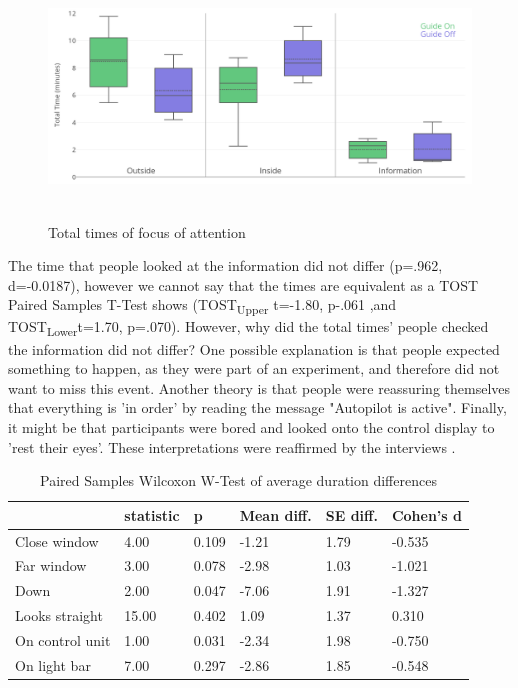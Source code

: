 \begin{figure}
    \includegraphics[width=1\textwidth]{fig/Total.png}\hfill\
    \caption[Times of Attention]{Total times of focus of attention}
    \label{fig:attentionTotal}
\end{figure}

The time that people looked at the information did not differ (p=.962, d=-0.0187), however we cannot say that the times are equivalent as a TOST \citep{Mara2012Paired-samplesEquivalence} Paired Samples T-Test shows
(TOST\textsubscript{Upper} t=-1.80, p-.061 ,and TOST\textsubscript{Lower}t=1.70, p=.070).
However, why did the total times' people checked the information did not differ? One possible explanation is that people expected something to happen, as they were part of an experiment, and therefore did not want to miss this event. Another theory is that people were reassuring themselves that everything is 'in order' by reading the message "Autopilot is active". Finally, it might be that participants were bored and looked onto the control display to 'rest their eyes'. These interpretations were reaffirmed by the interviews \emph{}. 

\begin{table}
\label{tab:averageVideo}
  \caption{Paired Samples Wilcoxon W-Test of average duration differences}
\begin{tabular}{@{}llllll@{}}
\toprule
 & statistic & p & Mean diff. & SE diff. & Cohen's d \\ \midrule
Close window & 4.00 & 0.109 & -1.21 & 1.79 & -0.535 \\
Far window & 3.00 & 0.078 & -2.98 & 1.03 & -1.021 \\
Down & 2.00 & 0.047 & -7.06 & 1.91 & -1.327 \\
Looks straight & 15.00 & 0.402 & 1.09 & 1.37 & 0.310 \\
On control unit & 1.00 & 0.031 & -2.34 & 1.98 & -0.750 \\
On light bar & 7.00 & 0.297 & -2.86 & 1.85 & -0.548 \\ \bottomrule
\end{tabular}
\end{table}

